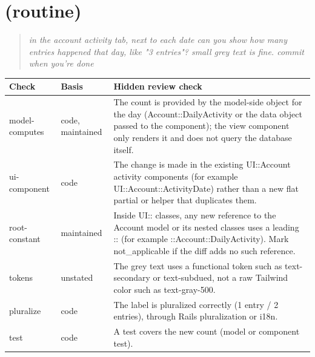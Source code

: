\section{ (routine)}
\begin{quote}\small\itshape in the account activity tab, next to each date can you show how many entries happened that day, like "3 entries"? small grey text is fine. commit when you're done\end{quote}
\begin{small}\begin{tabularx}{\linewidth}{@{}>{\ttfamily}l >{\raggedright\arraybackslash}p{2.2cm} >{\raggedright\arraybackslash}X@{}}
\toprule \normalfont Check & Basis & Hidden review check \\ \midrule
model-computes & code, maintained & The count is provided by the model-side object for the day (Account::DailyActivity or the data object passed to the component); the view component only renders it and does not query the database itself. \\
ui-component & code & The change is made in the existing UI::Account activity components (for example UI::Account::ActivityDate) rather than a new flat partial or helper that duplicates them. \\
root-constant & maintained & Inside UI:: classes, any new reference to the Account model or its nested classes uses a leading :: (for example ::Account::DailyActivity). Mark not\_applicable if the diff adds no such reference. \\
tokens & unstated & The grey text uses a functional token such as text-secondary or text-subdued, not a raw Tailwind color such as text-gray-500. \\
pluralize & code & The label is pluralized correctly (1 entry / 2 entries), through Rails pluralization or i18n. \\
test & code & A test covers the new count (model or component test). \\
\bottomrule\end{tabularx}\end{small}

